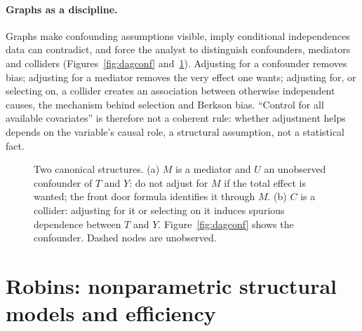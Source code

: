 \paragraph{Graphs as a discipline.} Graphs make confounding assumptions visible, imply conditional independences data can contradict, and force the analyst to distinguish confounders, mediators and colliders (Figures~\ref{fig:dagconf} and~\ref{fw:fig:dags}). Adjusting for a confounder removes bias; adjusting for a mediator removes the very effect one wants; adjusting for, or selecting on, a collider creates an association between otherwise independent causes, the mechanism behind selection and Berkson bias. ``Control for all available covariates'' is therefore not a coherent rule: whether adjustment helps depends on the variable's causal role, a structural assumption, not a statistical fact.

\begin{figure}[htbp]
\centering
{}
\caption{Two canonical structures. (a) $M$ is a mediator and $U$ an unobserved confounder of $T$ and $Y$: do not adjust for $M$ if the total effect is wanted; the front door formula identifies it through $M$. (b) $C$ is a collider: adjusting for it or selecting on it induces spurious dependence between $T$ and $Y$. Figure~\ref{fig:dagconf} shows the confounder. Dashed nodes are unobserved.}
\label{fw:fig:dags}
\end{figure}

\section{Robins: nonparametric structural models and efficiency}\label{fw:sec:robins}

